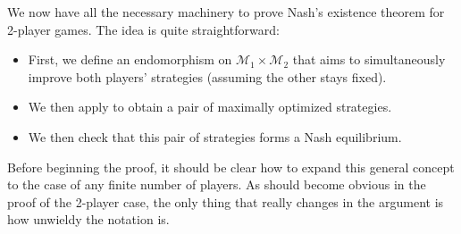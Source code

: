 \documentclass[twoside,10pt]{article}
\begin{document}
We now have all the necessary machinery to prove Nash's existence theorem for 2-player games. The idea is quite straightforward:
\begin{itemize}
	\item First, we define an endomorphism on $\mathcal{M}_1 \times \mathcal{M}_2$ that aims to simultaneously improve both players' strategies (assuming the other stays fixed).
	\item We then apply  to obtain a pair of maximally optimized strategies.
	\item We then check that this pair of strategies forms a Nash equilibrium.
\end{itemize}
Before beginning the proof, it should be clear how to expand this general concept to the case of any finite number of players. As should become obvious in the proof of the 2-player case, the only thing that really changes in the argument is how unwieldy the notation is.
\end{document}
